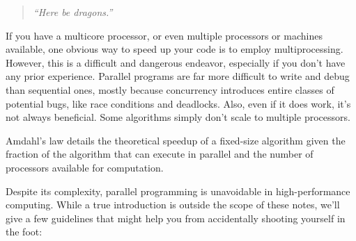 \label{chap:Parallel computing}

\begin{quote}\small
  \emph{``Here be dragons.''}
\end{quote}

If you have a multicore processor, or even multiple processors or machines available, one obvious way to speed up your code is to employ multiprocessing.
However, this is a difficult and dangerous endeavor, especially if you don't have any prior experience.
Parallel programs are far more difficult to write and debug than sequential ones, mostly because concurrency introduces entire classes of potential bugs, like race conditions and deadlocks.
Also, even if it does work, it's not always beneficial.
Some algorithms simply don't scale to multiple processors.
\begin{marginfigure}
  \caption{Amdahl's law details the theoretical speedup of a fixed-size algorithm given the fraction of the algorithm that can execute in parallel and the number of processors available for computation.}
\end{marginfigure}
Despite its complexity, parallel programming is unavoidable in high-performance computing.
While a true introduction is outside the scope of these notes, we'll give a few guidelines that might help you from accidentally shooting yourself in the foot:
